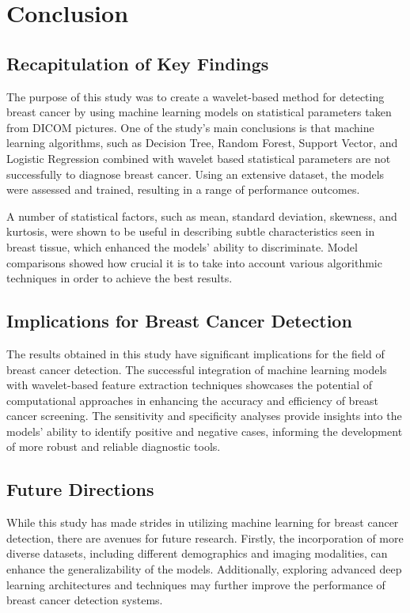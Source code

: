 \chapter{Conclusion}
\label{chap5}
\section{Recapitulation of Key Findings}
The purpose of this study was to create a wavelet-based method for detecting breast cancer by using machine learning models on statistical parameters taken from DICOM pictures. One of the study's main conclusions is that machine learning algorithms, such as Decision Tree, Random Forest, Support Vector, and Logistic Regression combined with wavelet based statistical parameters are not successfully to diagnose breast cancer. Using an extensive dataset, the models were assessed and trained, resulting in a range of performance outcomes.

A number of statistical factors, such as mean, standard deviation, skewness, and kurtosis, were shown to be useful in describing subtle characteristics seen in breast tissue, which enhanced the models' ability to discriminate. Model comparisons showed how crucial it is to take into account various algorithmic techniques in order to achieve the best results.
\section{Implications for Breast Cancer Detection}
The results obtained in this study have significant implications for the field of breast cancer detection. The successful integration of machine learning models with wavelet-based feature extraction techniques showcases the potential of computational approaches in enhancing the accuracy and efficiency of breast cancer screening. The sensitivity and specificity analyses provide insights into the models' ability to identify positive and negative cases, informing the development of more robust and reliable diagnostic tools.

\section{Future Directions}
While this study has made strides in utilizing machine learning for breast cancer detection, there are avenues for future research. Firstly, the incorporation of more diverse datasets, including different demographics and imaging modalities, can enhance the generalizability of the models. Additionally, exploring advanced deep learning architectures and techniques may further improve the performance of breast cancer detection systems.

